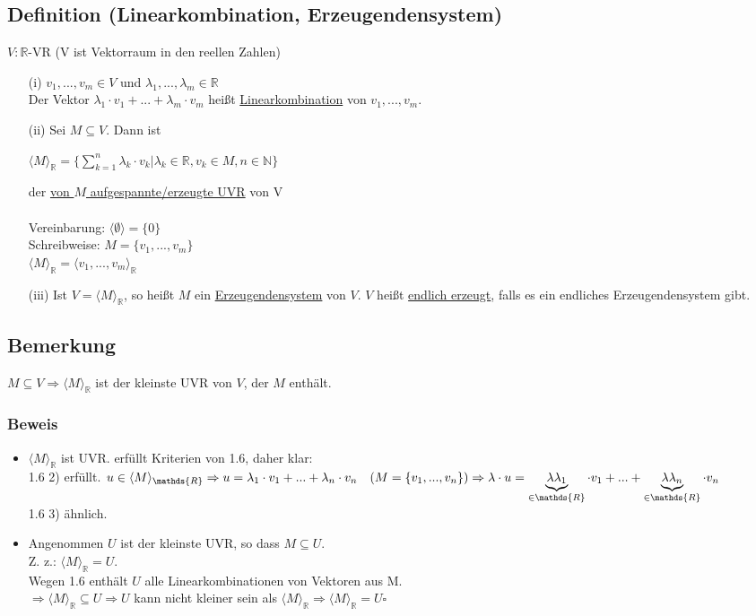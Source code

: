 \documentclass[12pt,titlepage, pdf]{article}
\newcommand{\R}{\mathds{R}}
\newcommand{\uline}[1]{\underline{#1}}
\renewcommand{\>}{\rightarrow}
\renewcommand{\*}{\cdot}
\begin{document}
\subsection{Definition (Linearkombination, Erzeugendensystem)}
$V: \R$-VR (V ist Vektorraum in den reellen Zahlen) \\
\begin{itemize}
	\item[(i)] $v_1, ... , v_m \in V$ und $\lambda_1,...,\lambda_m \in \R$\\ Der Vektor $\lambda_1 \* v_1 + ... + \lambda_m \* v_m$ heißt \uline{Linearkombination} von $v_1,...,v_m$.
	\item[(ii)] Sei $M \subseteq V$. Dann ist
	\begin{center}
		$\langle M \rangle_{\R} = \{ \sum_{k = 1}^{n} \lambda_k \cdot v_k \vert \lambda_k \in \R, v_k \in M, n \in \mathds{N}\}$
	\end{center}
	der \underline{von $M$ aufgespannte/erzeugte UVR} von V \\
	\\
	Vereinbarung: $\langle \emptyset \rangle = \{0\}$\\
	Schreibweise: $M = \{v_1,...,v_m\}$\\
	\noindent\hspace*{22mm}$\langle M \rangle_{\R} = \langle v_1,..., v_m\rangle_{\R} $
	\item[(iii)]
	Ist $V = \langle M \rangle_{\R}$, so heißt $M$ ein \uline{Erzeugendensystem} von $V$. $V$ heißt \uline{endlich erzeugt}, falls es ein endliches Erzeugendensystem gibt.
\end{itemize}
\subsection{Bemerkung}
$M \subseteq V \Rightarrow \langle M \rangle_{\R}$ ist der kleinste UVR von $V$, der $M$ enthält.\\
\subsubsection*{Beweis}
\begin{itemize}
	\item $\langle M \rangle_{\R}$ ist UVR. erfüllt Kriterien von 1.6, daher klar: \\
	1.6 2) erfüllt. $u \in \langle M \rangle_{\R} \Rightarrow u = \lambda_1 \cdot v_1 + ... + \lambda_n \cdot v_n\quad(M = \{v_1, ..., v_n \})\\ \Rightarrow \lambda \cdot u = \underbrace{\lambda  \lambda_1}_{\in \R} \cdot v_1 + ... + \underbrace{\lambda \lambda_n}_{\in \R} \cdot v_n$\\
	1.6 3) ähnlich.
	\item Angenommen $U$ ist der kleinste UVR, so dass $M \subseteq U$. \\
	Z. z.: $\langle M \rangle_{\R} = U.$\\
	Wegen 1.6 enthält $U$ alle Linearkombinationen von Vektoren aus M. \\
	$\Rightarrow \langle M \rangle_{\R} \subseteq U \Rightarrow U$ kann nicht kleiner sein als $\langle M \rangle_{\R} \Rightarrow \langle M \rangle_{\R} = U$\hfill$\square$
\end{itemize}
\end{document}
